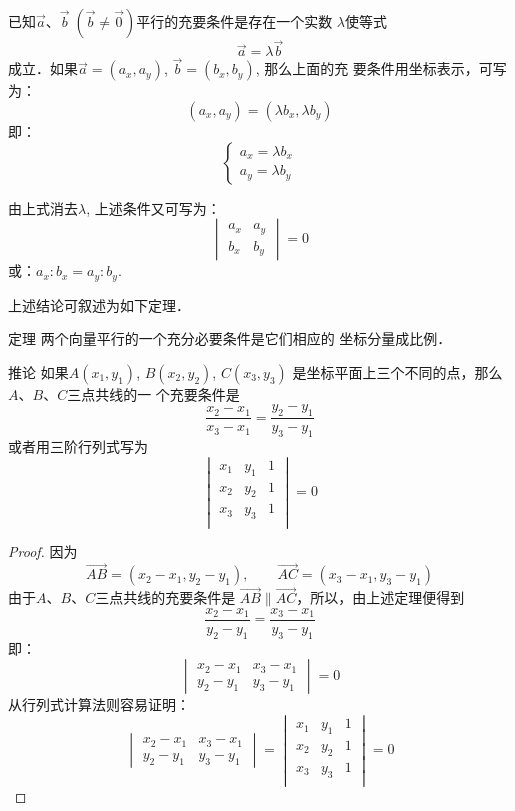 已知$\vec{a}$、$\vec{b}\; (\vec{b}\ne \vec{0})$平行的充要条件是存在一个实数
$\lambda$使等式
\[\vec{a}=\lambda\vec{b}\]
成立．如果$\vec{a}=(a_x,a_y)$, $\vec{b}=(b_x,b_y)$, 
那么上面的充
要条件用坐标表示，可写为：
\[(a_x,a_y)=(\lambda b_x,\lambda b_y)\]
即：
\[\begin{cases}
    a_x=\lambda b_x\\
a_y=\lambda b_y
\end{cases}\]

由上式消去$\lambda$, 上述条件又可写为：
\[\begin{vmatrix}
    a_x& a_y\\b_x&b_y
\end{vmatrix}=0\]
或：$a_x:b_x=a_y:b_y$.

上述结论可叙述为如下定理．

\begin{blk}
    {定理} 两个向量平行的一个充分必要条件是它们相应的
坐标分量成比例．
\end{blk}

\begin{blk}
{推论} 如果$A(x_1,y_1)$, $B(x_2,y_2)$, $C(x_3,y_3)$
是坐标平面上三个不同的点，那么$A$、$B$、$C$三点共线的一
个充要条件是
\[\frac{x_2-x_1}{x_3-x_1}=\frac{y_2-y_1}{y_3-y_1}\]
或者用三阶行列式写为
\[\begin{vmatrix}
    x_1&y_1&1\\
    x_2&y_2&1\\
    x_3&y_3&1\\
\end{vmatrix}=0\]
\end{blk}

\begin{proof}
    因为
\[\Vec{AB}=(x_2-x_1,y_2-y_1),\qquad \Vec{AC}=(x_3-x_1,y_3-y_1)\]
由于$A$、$B$、$C$三点共线的充要条件是
$\Vec{AB}\parallel \Vec{AC}$，所以，由上述定理便得到
\[\frac{x_2-x_1}{y_2-y_1}=\frac{x_3-x_1}{y_3-y_1}\]
即：\[\begin{vmatrix}
    x_2-x_1&x_3-x_1\\
    y_2-y_1&y_3-y_1
\end{vmatrix}=0\]
从行列式计算法则容易证明：
\[\begin{vmatrix}
    x_2-x_1&x_3-x_1\\
    y_2-y_1&y_3-y_1
\end{vmatrix}=\begin{vmatrix}
    x_1&y_1&1\\
    x_2&y_2&1\\
    x_3&y_3&1\\
\end{vmatrix}=0\]
\end{proof}

